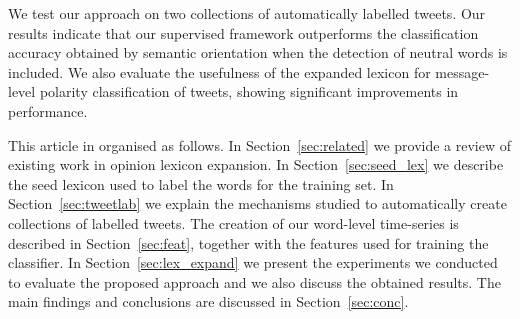 \documentclass{sig-alternate}
\begin{document}



 
We test our approach on two collections of automatically labelled tweets. Our results indicate that our supervised framework outperforms the classification accuracy obtained by  semantic orientation when the detection of neutral words is included. We also evaluate the usefulness of the expanded lexicon for message-level polarity classification of tweets, showing significant improvements in performance.   
 
This article in organised as follows. In Section~\ref{sec:related} we provide a review of existing work in opinion lexicon expansion. In Section~\ref{sec:seed_lex} we describe the seed lexicon used to label the words for the training set. In Section~\ref{sec:tweetlab} we explain the mechanisms studied to automatically create collections of labelled tweets.
 The creation of our word-level time-series is described in Section~\ref{sec:feat}, together with the features used for training the classifier. In Section~\ref{sec:lex_expand} we present the experiments we conducted to evaluate the proposed approach and we also discuss the obtained results. The main findings and conclusions are discussed in Section~\ref{sec:conc}.
\end{document}
